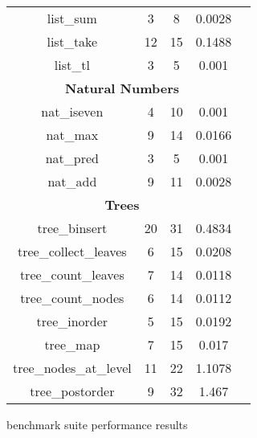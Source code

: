\begin{figure}
\begin{center}
\begin{tabular}{ccccc}
list\_sum & 3 & 8 & 0.0028 \\
list\_take & 12 & 15 & 0.1488 \\
list\_tl & 3 & 5 & 0.001 \\
\multicolumn{4}{c}{\textbf{Natural Numbers}} \\
nat\_iseven & 4 & 10 & 0.001 \\
nat\_max & 9 & 14 & 0.0166 \\
nat\_pred & 3 & 5 & 0.001 \\
nat\_add & 9 & 11 & 0.0028 \\
\multicolumn{4}{c}{\textbf{Trees}} \\
tree\_binsert & 20 & 31 & 0.4834 \\
tree\_collect\_leaves & 6 & 15 & 0.0208 \\
tree\_count\_leaves & 7 & 14 & 0.0118 \\
tree\_count\_nodes & 6 & 14 & 0.0112 \\
tree\_inorder & 5 & 15 & 0.0192 \\
tree\_map & 7 & 15 & 0.017 \\
tree\_nodes\_at\_level & 11 & 22 & 1.1078 \\
tree\_postorder & 9 & 32 & 1.467 \\

  \hline
  \end{tabular}
  \end{center}
  \caption{\myth{} benchmark suite performance results}
  \label{tbl:myth-raw-benchmarks}
\end{figure}
